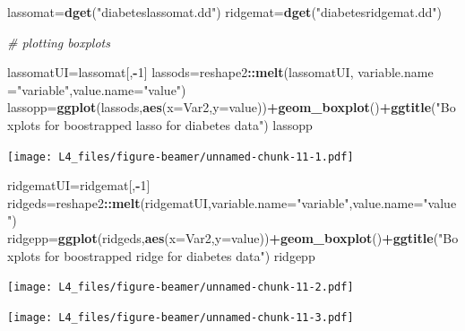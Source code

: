 \documentclass[
  ignorenonframetext,
]{beamer}
\newenvironment{Shaded}{\begin{snugshade}}{\end{snugshade}}
\newcommand{\CommentTok}[1]{\textcolor[rgb]{0.56,0.35,0.01}{\textit{#1}}}
\newcommand{\DataTypeTok}[1]{\textcolor[rgb]{0.13,0.29,0.53}{#1}}
\newcommand{\DecValTok}[1]{\textcolor[rgb]{0.00,0.00,0.81}{#1}}
\newcommand{\KeywordTok}[1]{\textcolor[rgb]{0.13,0.29,0.53}{\textbf{#1}}}
\newcommand{\NormalTok}[1]{#1}
\newcommand{\OperatorTok}[1]{\textcolor[rgb]{0.81,0.36,0.00}{\textbf{#1}}}
\newcommand{\StringTok}[1]{\textcolor[rgb]{0.31,0.60,0.02}{#1}}
\begin{document}
\begin{frame}[fragile]

\begin{Shaded}
\begin{Highlighting}[]
\NormalTok{lassomat=}\KeywordTok{dget}\NormalTok{(}\StringTok{"diabeteslassomat.dd"}\NormalTok{)}
\NormalTok{ridgemat=}\KeywordTok{dget}\NormalTok{(}\StringTok{"diabetesridgemat.dd"}\NormalTok{)}

\CommentTok{# plotting boxplots}

\NormalTok{lassomatUI=lassomat[,}\OperatorTok{-}\DecValTok{1}\NormalTok{]}
\NormalTok{lassods=reshape2}\OperatorTok{::}\KeywordTok{melt}\NormalTok{(lassomatUI,}
         \DataTypeTok{variable.name =}\StringTok{"variable"}\NormalTok{,}\DataTypeTok{value.name=}\StringTok{"value"}\NormalTok{)}
\NormalTok{lassopp=}\KeywordTok{ggplot}\NormalTok{(lassods,}\KeywordTok{aes}\NormalTok{(}\DataTypeTok{x=}\NormalTok{Var2,}\DataTypeTok{y=}\NormalTok{value))}\OperatorTok{+}\KeywordTok{geom_boxplot}\NormalTok{()}\OperatorTok{+}\KeywordTok{ggtitle}\NormalTok{(}\StringTok{"Boxplots for boostrapped lasso for diabetes data"}\NormalTok{)}
\NormalTok{lassopp}
\end{Highlighting}
\end{Shaded}

\texttt{[image: L4\_files/figure-beamer/unnamed-chunk-11-1.pdf]}

\begin{Shaded}
\begin{Highlighting}[]
\NormalTok{ridgematUI=ridgemat[,}\OperatorTok{-}\DecValTok{1}\NormalTok{]}
\NormalTok{ridgeds=reshape2}\OperatorTok{::}\KeywordTok{melt}\NormalTok{(ridgematUI,}\DataTypeTok{variable.name=}\StringTok{"variable"}\NormalTok{,}\DataTypeTok{value.name=}\StringTok{"value"}\NormalTok{)}
\NormalTok{ridgepp=}\KeywordTok{ggplot}\NormalTok{(ridgeds,}\KeywordTok{aes}\NormalTok{(}\DataTypeTok{x=}\NormalTok{Var2,}\DataTypeTok{y=}\NormalTok{value))}\OperatorTok{+}\KeywordTok{geom_boxplot}\NormalTok{()}\OperatorTok{+}\KeywordTok{ggtitle}\NormalTok{(}\StringTok{"Boxplots for boostrapped ridge for diabetes data"}\NormalTok{)}
\NormalTok{ridgepp}
\end{Highlighting}
\end{Shaded}

\texttt{[image: L4\_files/figure-beamer/unnamed-chunk-11-2.pdf]}

\begin{Shaded}
\end{Shaded}

\texttt{[image: L4\_files/figure-beamer/unnamed-chunk-11-3.pdf]}

\end{frame}
\end{document}

